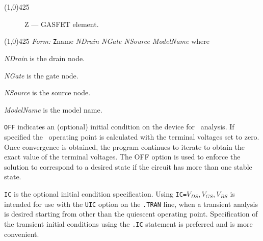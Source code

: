 \oddsidemargin 10mm \topmargin 0.0in \textwidth 5.5in \textheight
7.375in \evensidemargin 1.0in \headheight 0.18in \footskip 0.16in
%
\section[Z \- MESFET]{}
\linethickness{1mm}
\line(1,0){425}
\normalsize
\begin{figure}[h]
\centering \epsfxsize=1.4in \caption{Z --- GASFET
element. \label{zspice3.ps}}
\end{figure}
\linethickness{0.5mm} \line(1,0){425}
\newline
\textit{Form:}
\newline
{\tt Z}name {\it NDrain NGate NSource ModelName} \E
{}\E {} \E
\newline
where
\newline
\begin{widelist}
\item[{\it NDrain}] is the drain node.
\item[{\it NGate}] is the gate node.
\item[{\it NSource}] is the source node.
\item[{\it ModelName}]  is  the  model name.
\item[{\tt OFF}] indicates an (optional) initial condition on the device for
\dc\ analysis.  If specified the \dc\ operating point is
calculated with the terminal voltages set to zero.  Once
convergence is obtained, the program continues to iterate to
obtain the exact  value of the  terminal  voltages.  The OFF
option is used to enforce the solution to  correspond  to  a
desired  state if the circuit has more than one stable state.
\item[{\tt IC}] is the optional  initial condition specification.
Using {\tt IC=}$V_{DS},V_{GS}, V_{BS}$ is intended for use with
the {\tt UIC} option on  the  {\tt .TRAN}  line,  when  a
transient analysis is desired starting from other than the
quiescent operating point. Specification of the transient initial
conditions using the {\tt .IC} statement is preferred and is more
convenient.
\end{widelist}
